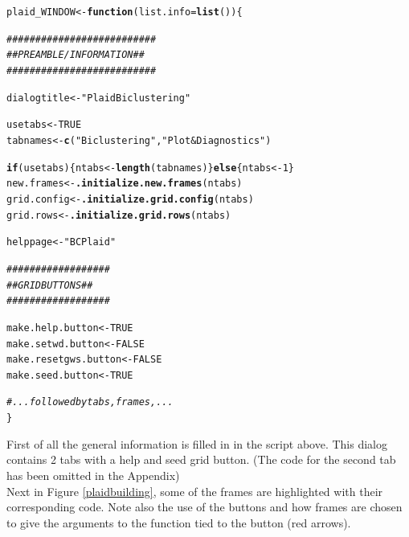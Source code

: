 \documentclass[a4paper]{article}\usepackage[]{graphicx}\usepackage[]{color}
\makeatletter
\newcommand{\hlnum}[1]{\textcolor[rgb]{0.686,0.059,0.569}{#1}}%
\newcommand{\hlstr}[1]{\textcolor[rgb]{0.192,0.494,0.8}{#1}}%
\newcommand{\hlcom}[1]{\textcolor[rgb]{0.678,0.584,0.686}{\textit{#1}}}%
\newcommand{\hlstd}[1]{\textcolor[rgb]{0.345,0.345,0.345}{#1}}%
\newcommand{\hlkwa}[1]{\textcolor[rgb]{0.161,0.373,0.58}{\textbf{#1}}}%
\newcommand{\hlkwb}[1]{\textcolor[rgb]{0.69,0.353,0.396}{#1}}%
\newcommand{\hlkwc}[1]{\textcolor[rgb]{0.333,0.667,0.333}{#1}}%
\newcommand{\hlkwd}[1]{\textcolor[rgb]{0.737,0.353,0.396}{\textbf{#1}}}%
\newenvironment{kframe}{%
 \def\at@end@of@kframe{}%
 \ifinner\ifhmode%
  \def\at@end@of@kframe{\end{minipage}}%
  \begin{minipage}{\columnwidth}%
 \fi\fi%
 \def\FrameCommand##1{\hskip\@totalleftmargin \hskip-\fboxsep
 \colorbox{shadecolor}{##1}\hskip-\fboxsep
     \hskip-\linewidth \hskip-\@totalleftmargin \hskip\columnwidth}%
 \MakeFramed {\advance\hsize-\width
   \@totalleftmargin\z@ \linewidth\hsize
   \@setminipage}}%
 {\par\unskip\endMakeFramed%
 \at@end@of@kframe}
\newenvironment{knitrout}{}{} %
\makeatother
\begin{document}
\begin{knitrout}
\color{fgcolor}\begin{kframe}
\begin{alltt}
\hlstd{plaid_WINDOW} \hlkwb{<-} \hlkwa{function}\hlstd{(}\hlkwc{list.info}\hlstd{=}\hlkwd{list}\hlstd{())\{}

    \hlcom{##########################}
    \hlcom{## PREAMBLE/INFORMATION ##}
    \hlcom{##########################}

    \hlstd{dialogtitle} \hlkwb{<-} \hlstr{"Plaid Biclustering"}

    \hlstd{usetabs} \hlkwb{<-} \hlnum{TRUE}
    \hlstd{tabnames} \hlkwb{<-} \hlkwd{c}\hlstd{(}\hlstr{"Biclustering"}\hlstd{,}\hlstr{"Plot & Diagnostics"}\hlstd{)}

    \hlkwa{if}\hlstd{(usetabs)\{ntabs} \hlkwb{<-} \hlkwd{length}\hlstd{(tabnames)\}} \hlkwa{else} \hlstd{\{ntabs} \hlkwb{<-} \hlnum{1}\hlstd{\}}
    \hlstd{new.frames} \hlkwb{<-} \hlkwd{.initialize.new.frames}\hlstd{(ntabs)}
    \hlstd{grid.config} \hlkwb{<-} \hlkwd{.initialize.grid.config}\hlstd{(ntabs)}
    \hlstd{grid.rows} \hlkwb{<-} \hlkwd{.initialize.grid.rows}\hlstd{(ntabs)}

    \hlstd{helppage} \hlkwb{<-} \hlstr{"BCPlaid"}

    \hlcom{##################}
    \hlcom{## GRID BUTTONS ##}
    \hlcom{##################}

    \hlstd{make.help.button} \hlkwb{<-} \hlnum{TRUE}
    \hlstd{make.setwd.button} \hlkwb{<-} \hlnum{FALSE}
    \hlstd{make.resetgws.button} \hlkwb{<-} \hlnum{FALSE}
    \hlstd{make.seed.button} \hlkwb{<-} \hlnum{TRUE}

        \hlcom{#... followed by tabs, frames,...}
\hlstd{\}}
\end{alltt}
\end{kframe}
\end{knitrout}
\noindent First of all the general information is filled in in the script above.
This dialog contains 2 tabs with a help and seed grid button. 
(The code for the second tab has been omitted in the Appendix)\\
Next in Figure \ref{plaidbuilding}, some of the frames are highlighted with
their corresponding code. Note also the use of the buttons and how frames are
chosen to give the arguments to the function tied to the button (red arrows).
\end{document}
